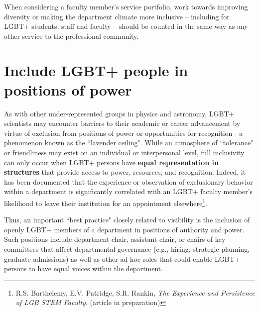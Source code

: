 When considering a faculty member's service portfolio, work towards improving diversity or making the department climate more inclusive -- including for LGBT+ students, staff and faculty -- should be counted in the same way as any other service to the professional community.


\section {Include LGBT+ people in positions of power}
\label{positions-of-power}
As with other under-represented groups in physics and astronomy, LGBT+ scientists may encounter barriers to their academic or career advancement by virtue of exclusion from positions of power or opportunities for recognition - a phenomenon known as the ``lavender ceiling". While an atmosphere of ``tolerance" or friendliness may exist on an individual or interpersonal level, full inclusivity can only occur when LGBT+ persons have \textbf{equal representation in structures} that provide access to power, resources, and recognition. Indeed, it has been documented that the experience or observation of exclusionary behavior within a department is significantly correlated with an LGBT+ faculty member's likelihood to leave their institution for an appointment elsewhere\footnote{R.S. Barthelemy, E.V. Patridge, S.R. Rankin, \emph{The Experience and Persistence of LGB STEM Faculty}. (article in preparation)}.

Thus, an important ``best practice" closely related to visibility is the inclusion of openly LGBT+ members of a department in positions of authority and power. Such positions include department chair, assistant chair, or chairs of key committees that affect departmental governance (e.g., hiring, strategic planning, graduate admissions) as well as other ad hoc roles that could enable LGBT+ persons to have equal voices within the department.

